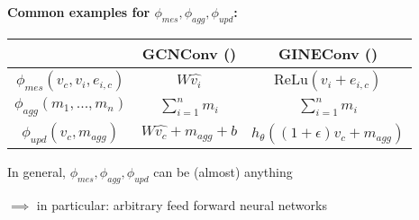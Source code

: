 \textbf{Common examples for $\phi_{mes},\phi_{agg},\phi_{upd}$:}
\begin{center}
    \begin{tabular}{ c|cc } 
        & GCNConv (\cite{paperGCNConv})  & GINEConv (\cite{paperGINEConv})\\ 
        \hline
        $\phi_{mes}(v_c, v_i, e_{i,c})$& $W\widehat{v_i}$ & $\text{ReLu}(v_i+e_{i,c})$ \\ 
        $\phi_{agg}(m_1,...,m_n)$ & $\sum_{i=1}^{n}m_i$ & $\sum_{i=1}^{n}m_i$\\ 
        $\phi_{upd}(v_c,m_{agg})$ & $W\widehat{v_c}+m_{agg}+b$ & $h_\theta\left((1+\epsilon)v_c+m_{agg}\right)$
    \end{tabular}
\end{center}

In general, $\phi_{mes},\phi_{agg},\phi_{upd}$ can be (almost) anything\par
$\implies$ in particular: arbitrary feed forward neural networks